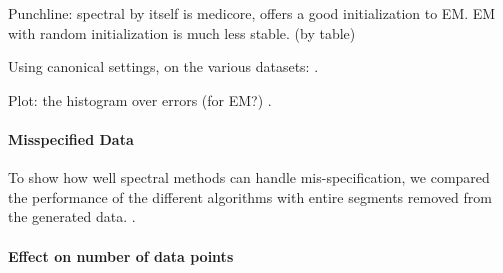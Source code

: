 Punchline: spectral by itself is medicore, offers a good initialization to EM.
EM with random initialization is much less stable. (by table)

Using canonical settings, on the various datasets: .

Plot: the histogram over errors (for EM?) .

\paragraph{Misspecified Data}

To show how well spectral methods can handle mis-specification, we
compared the performance of the different algorithms with entire
segments removed from the generated data. .

\paragraph{Effect on number of data points}

\begin{figure}[t]
  \centering
    \hspace{-2em}
  \caption{}
  \label{fig:vs-n}
\end{figure}

